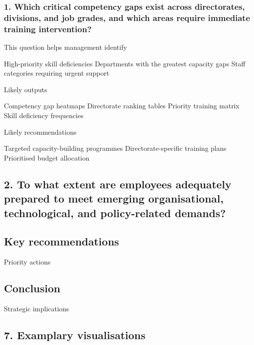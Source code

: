 \documentclass[
]{article}
\begin{document}
\subsubsection{1. Which critical competency gaps exist across
directorates, divisions, and job grades, and which areas require
immediate training
intervention?}\label{which-critical-competency-gaps-exist-across-directorates-divisions-and-job-grades-and-which-areas-require-immediate-training-intervention}

This question helps management identify

High-priority skill deficiencies Departments with the greatest capacity
gaps Staff categories requiring urgent support

Likely outputs

Competency gap heatmaps Directorate ranking tables Priority training
matrix Skill deficiency frequencies

Likely recommendations

Targeted capacity-building programmes Directorate-specific training
plans Prioritised budget allocation

\subsection{2. To what extent are employees adequately prepared to meet
emerging organisational, technological, and policy-related
demands?}\label{to-what-extent-are-employees-adequately-prepared-to-meet-emerging-organisational-technological-and-policy-related-demands}

\subsection{Key recommendations}\label{key-recommendations}

Priority actions

\subsection{Conclusion}\label{conclusion}

Strategic implications

\subsection{7. Examplary visualisations}\label{examplary-visualisations}
\end{document}
